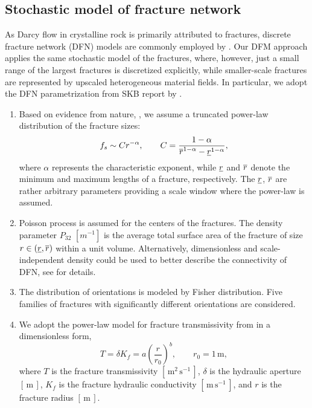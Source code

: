 \subsection{Stochastic model of fracture network}
As Darcy flow in crystalline rock is primarily attributed to fractures,
discrete fracture network (DFN) models are commonly employed by
\cite{deDreuzy2012Influence}. Our DFM approach applies the same stochastic
model of the fractures, where, however, just a small range of the largest
fractures is discretized explicitly, while smaller-scale fractures are
represented by upscaled heterogeneous material fields. In particular, we adopt
the DFN parametrization from SKB report by \cite{Ohman_Site_2010}.
\begin{enumerate}
\item Based on evidence from nature, \cite{Bonnet_Scaling_2001}, we assume a
truncated power-law distribution of the fracture sizes:
\begin{equation}
    \label{pow_law}
    f_s \sim C r^{-\alpha},
    \qquad
    C = \frac{1-\alpha}{\overline r^{1-\alpha} - \underline r^{1-\alpha}},
\end{equation}
where $\alpha$ represents the characteristic exponent, while $\underline r$ and
$\overline r$ denote the minimum and maximum lengths of a fracture, respectively. The
$\underline r$, $\overline r$ are rather arbitrary parameters providing a scale window where
the power-law is assumed.

\item Poisson process is assumed for the centers of the fractures. The density
parameter
$P_{32}$  $[m^{-1}]$ is the average total surface area of the fracture of size
$r\in(\underline r, \overline r)$ within a unit volume. Alternatively, dimensionless and
scale-independent density could be used to better describe the connectivity of
DFN, see \cite{Adler1999} for details.

\item
The distribution of orientations is modeled by Fisher distribution. Five
families of fractures with significantly different orientations are considered.

\item We adopt the power-law model for fracture transmissivity from
\cite{Ohman_Site_2010} in a dimensionless form,
\[
    T = \delta K_f = a\left(\frac{r}{r_0}\right)^{b},
\qquad r_0 = 1\,\mathrm{m},
\]
where $T$ is the fracture transmissivity $[\,\mathrm{m^2\,s^{-1}}\,]$, $\delta$
is the hydraulic aperture
$[\,\mathrm{m}\,]$, $K_f$ is the fracture hydraulic conductivity
$[\,\mathrm{m\,s^{-1}}\,]$, and $r$ is the fracture radius
$[\,\mathrm{m}\,]$.


\end{enumerate}
